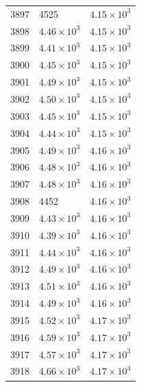 \begin{table}[H]
\begin{tabular}{lll}
3897 & 4525 & $\displaystyle 4.15 \times 10^{3}$ \\
3898 & $\displaystyle 4.46 \times 10^{3}$ & $\displaystyle 4.15 \times 10^{3}$ \\
3899 & $\displaystyle 4.41 \times 10^{3}$ & $\displaystyle 4.15 \times 10^{3}$ \\
3900 & $\displaystyle 4.45 \times 10^{3}$ & $\displaystyle 4.15 \times 10^{3}$ \\
3901 & $\displaystyle 4.49 \times 10^{3}$ & $\displaystyle 4.15 \times 10^{3}$ \\
3902 & $\displaystyle 4.50 \times 10^{3}$ & $\displaystyle 4.15 \times 10^{3}$ \\
3903 & $\displaystyle 4.45 \times 10^{3}$ & $\displaystyle 4.15 \times 10^{3}$ \\
3904 & $\displaystyle 4.44 \times 10^{3}$ & $\displaystyle 4.15 \times 10^{3}$ \\
3905 & $\displaystyle 4.49 \times 10^{3}$ & $\displaystyle 4.16 \times 10^{3}$ \\
3906 & $\displaystyle 4.48 \times 10^{3}$ & $\displaystyle 4.16 \times 10^{3}$ \\
3907 & $\displaystyle 4.48 \times 10^{3}$ & $\displaystyle 4.16 \times 10^{3}$ \\
3908 & 4452 & $\displaystyle 4.16 \times 10^{3}$ \\
3909 & $\displaystyle 4.43 \times 10^{3}$ & $\displaystyle 4.16 \times 10^{3}$ \\
3910 & $\displaystyle 4.39 \times 10^{3}$ & $\displaystyle 4.16 \times 10^{3}$ \\
3911 & $\displaystyle 4.44 \times 10^{3}$ & $\displaystyle 4.16 \times 10^{3}$ \\
3912 & $\displaystyle 4.49 \times 10^{3}$ & $\displaystyle 4.16 \times 10^{3}$ \\
3913 & $\displaystyle 4.51 \times 10^{3}$ & $\displaystyle 4.16 \times 10^{3}$ \\
3914 & $\displaystyle 4.49 \times 10^{3}$ & $\displaystyle 4.16 \times 10^{3}$ \\
3915 & $\displaystyle 4.52 \times 10^{3}$ & $\displaystyle 4.17 \times 10^{3}$ \\
3916 & $\displaystyle 4.59 \times 10^{3}$ & $\displaystyle 4.17 \times 10^{3}$ \\
3917 & $\displaystyle 4.57 \times 10^{3}$ & $\displaystyle 4.17 \times 10^{3}$ \\
3918 & $\displaystyle 4.66 \times 10^{3}$ & $\displaystyle 4.17 \times 10^{3}$ \\

\end{tabular}
\end{table}
